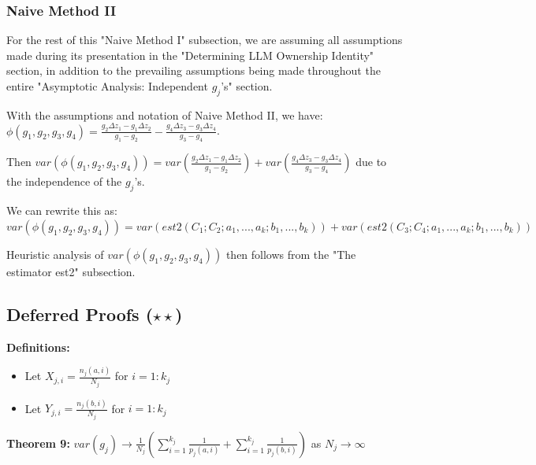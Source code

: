 \documentclass{article}
\begin{document}
\subsubsection{Naive Method II}
\begin{mdframed}
    For the rest of this "Naive Method I" subsection, we are assuming all assumptions made during its presentation in the "Determining LLM Ownership Identity" section, in addition to the prevailing assumptions being made throughout the entire "Asymptotic Analysis: Independent $\displaystyle g_{j}$'s" section.
\end{mdframed}
With the assumptions and notation of Naive Method II, we have: $\displaystyle \phi \left( g_{1} ,g_{2} ,g_{3} ,g_{4}\right) =\frac{g_{2} \Delta z_{1} -g_{1} \Delta z_{2}}{g_{1} -g_{2}} -\frac{g_{4} \Delta z_{3} -g_{3} \Delta z_{4}}{g_{3} -g_{4}}$.



Then $\displaystyle var\left( \phi \left( g_{1} ,g_{2} ,g_{3} ,g_{4}\right)\right) =var\left(\frac{g_{2} \Delta z_{1} -g_{1} \Delta z_{2}}{g_{1} -g_{2}}\right) +var\left(\frac{g_{4} \Delta z_{3} -g_{3} \Delta z_{4}}{g_{3} -g_{4}}\right)$ due to the independence of the $\displaystyle g_{j}$'s.



We can rewrite this as: $\displaystyle var\left( \phi \left( g_{1} ,g_{2} ,g_{3} ,g_{4}\right)\right) =var\left( est2\left( C_{1} ;C_{2} ;a_{1} ,...,a_{k} ;b_{1} ,...,b_{k}\right)\right) +var\left( est2\left( C_{3} ;C_{4} ;a_{1} ,...,a_{k} ;b_{1} ,...,b_{k}\right)\right)$



Heuristic analysis of $\displaystyle var\left( \phi \left( g_{1} ,g_{2} ,g_{3} ,g_{4}\right)\right)$ then follows from the "The estimator est2" subsection.


\subsection{Deferred Proofs ($\star\star$)}

\textbf{Definitions:}
\begin{itemize}
\item Let $\displaystyle X_{j,i} =\frac{n_{j}\left( a,i\right)}{N_{j}}$ for $\displaystyle i=1:k_{j}$
\item Let $\displaystyle Y_{j,i} =\frac{n_{j}\left( b,i\right)}{N_{j}}$ for $\displaystyle i=1:k_{j}$
\end{itemize}

\textbf{Theorem 9:} $\displaystyle var\left( g_{j}\right)\rightarrow \frac{1}{N_{j}}\left(\sum _{i=1}^{k_{j}}\frac{1}{p_{j}\left( a,i\right)} +\sum _{i=1}^{k_{j}}\frac{1}{p_{j}\left( b,i\right)}\right)$ as $\displaystyle N_{j}\rightarrow \infty $
\end{document}
